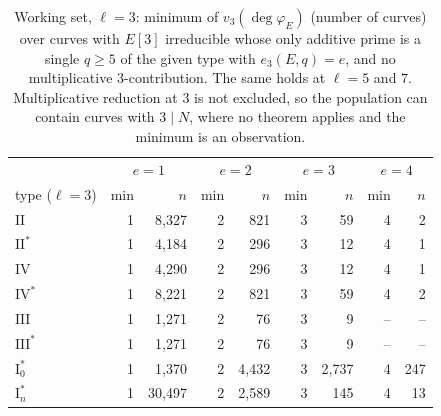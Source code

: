 \documentclass[11pt]{amsart}
\theoremstyle{definition}
\newcommand{\degphi}{\deg\varphi_E}
\begin{document}
\begin{table}[ht]\centering\footnotesize
{\footnotesize
\begin{tabular}{l rr rr rr rr}
\toprule
 & \multicolumn{2}{c}{$e=1$} & \multicolumn{2}{c}{$e=2$} & \multicolumn{2}{c}{$e=3$} & \multicolumn{2}{c}{$e=4$}\\
type ($\ell=3$) & min & $n$ & min & $n$ & min & $n$ & min & $n$\\
\midrule
$\mathrm{II}$ & 1 & 8,327 & 2 & 821 & 3 & 59 & 4 & 2\\
$\mathrm{II}^*$ & 1 & 4,184 & 2 & 296 & 3 & 12 & 4 & 1\\
$\mathrm{IV}$ & 1 & 4,290 & 2 & 296 & 3 & 12 & 4 & 1\\
$\mathrm{IV}^*$ & 1 & 8,221 & 2 & 821 & 3 & 59 & 4 & 2\\
$\mathrm{III}$ & 1 & 1,271 & 2 & 76 & 3 & 9 & -- & --\\
$\mathrm{III}^*$ & 1 & 1,271 & 2 & 76 & 3 & 9 & -- & --\\
$\mathrm{I}_0^*$ & 1 & 1,370 & 2 & 4,432 & 3 & 2,737 & 4 & 247\\
$\mathrm{I}_n^*$ & 1 & 30,497 & 2 & 2,589 & 3 & 145 & 4 & 13\\
\bottomrule
\end{tabular}
}
\caption{Working set, $\ell=3$: minimum of $v_3(\degphi)$ (number of curves) over curves with $E[3]$ irreducible whose only additive prime is a single $q\ge5$ of the given type with $e_3(E,q)=e$, and no multiplicative $3$-contribution. The same holds at $\ell=5$ and $7$. Multiplicative reduction at $3$ is not excluded, so the population can contain curves with $3\mid N$, where no theorem applies and the minimum is an observation.}\label{tab:iso}
\end{table}
\end{document}
